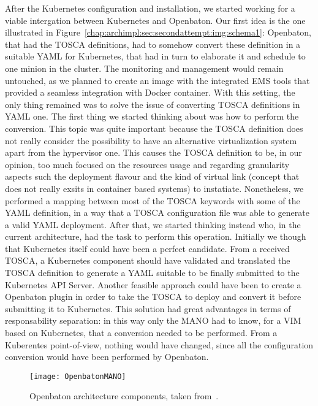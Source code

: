 After the Kubernetes configuration and installation, we started working for a
viable intergation between Kubernetes and Openbaton. Our first idea is the one
illustrated in Figure~\ref{chap:archimpl:sec:secondattempt:img:schema1}:
Openbaton, that had the TOSCA definitions, had to somehow convert these
definition in a suitable YAML for Kubernetes, that had in turn to elaborate it
and schedule to one minion in the cluster. The monitoring and management would
remain untouched, as we planned to create an image with the integrated EMS tools
that provided a seamless integration with Docker container. With this setting,
the only thing remained was to solve the issue of converting TOSCA definitions
in YAML one. The first thing we started thinking about was how to perform the
conversion. This topic was quite important because the TOSCA definition does not
really consider the possibility to have an alternative virtualization system
apart from the hypervisor one. This causes the TOSCA definition to be, in our
opinion, too much focused on the resources usage and regarding granularity
aspects such the deployment flavour and the kind of virtual link (concept that
does not really exsits in container based systems) to instatiate. Nonetheless,
we performed a mapping between most of the TOSCA keywords with some of the YAML
definition, in a way that a TOSCA configuration file was able to generate a
valid YAML deployment. After that, we started thinking instead who, in the
current architecture, had the task to perform this operation. Initially we
though that Kubernetes itself could have been a perfect candidate. From a
received TOSCA, a Kubernetes component should have validated and translated the
TOSCA definition to generate a YAML suitable to be finally submitted to the
Kubernetes API Server. Another feasible approach could have been to create a
Openbaton plugin in order to take the TOSCA to deploy and convert it before
submitting it to Kubernetes. This solution had great advantages in terms of
responsability separation: in this way only the MANO had to know, for a VIM
based on Kubernetes, that a conversion needed to be performed. From a Kuberentes
point-of-view, nothing would have changed, since all the configuration
conversion would have been performed by Openbaton.

\begin{figure}[t]
  \centering
  \texttt{[image: OpenbatonMANO]}
  \caption[Openbaton architecture components]{Openbaton architecture components,
    taken from~\cite{openbatondocumentation}.}
  \label{chap:archimpl:sec:secondattempt:img:openbatonMANO}
\end{figure}

